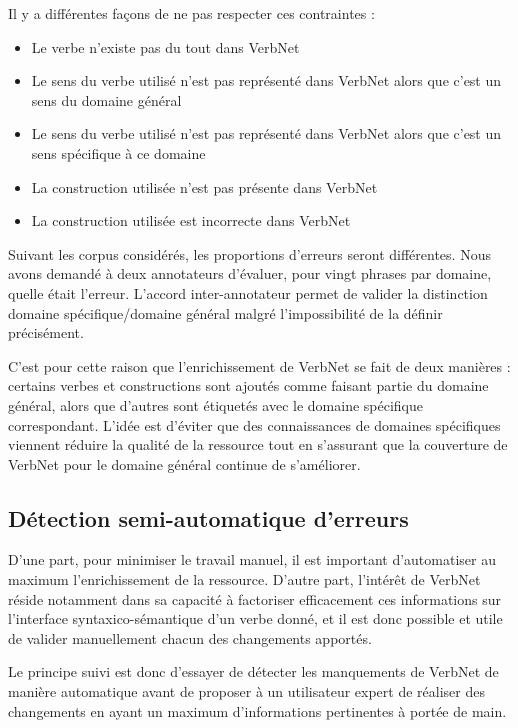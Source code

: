 Il y a différentes façons de ne pas respecter ces contraintes :

\begin{itemize}
    \item Le verbe n'existe pas du tout dans VerbNet
    \item Le sens du verbe utilisé n'est pas représenté dans VerbNet alors que c'est un sens du domaine général
    \item Le sens du verbe utilisé n'est pas représenté dans VerbNet alors que c'est un sens spécifique à ce domaine
    \item La construction utilisée n'est pas présente dans VerbNet
    \item La construction utilisée est incorrecte dans VerbNet
\end{itemize}

Suivant les corpus considérés, les proportions d'erreurs seront différentes.
Nous avons demandé à deux annotateurs d'évaluer, pour vingt phrases par
domaine, quelle était l'erreur. L'accord inter-annotateur permet de valider la
distinction domaine spécifique/domaine général malgré l'impossibilité de la
définir précisément. %

C'est pour cette raison que l'enrichissement de VerbNet se fait de deux
manières : certains verbes et constructions sont ajoutés comme faisant partie
du domaine général, alors que d'autres sont étiquetés avec le domaine
spécifique correspondant. L'idée est d'éviter que des connaissances de domaines
spécifiques viennent réduire la qualité de la ressource tout en s'assurant que
la couverture de VerbNet pour le domaine général continue de s'améliorer.

\subsection{Détection semi-automatique d'erreurs}

D'une part, pour minimiser le travail manuel, il est important d'automatiser au
maximum l'enrichissement de la ressource. D'autre part, l'intérêt de VerbNet
réside notamment dans sa capacité à factoriser efficacement ces informations
sur l'interface syntaxico-sémantique d'un verbe donné, et il est donc possible
et utile de valider manuellement chacun des changements apportés.

Le principe suivi est donc d'essayer de détecter les manquements de VerbNet de
manière automatique avant de proposer à un utilisateur expert de réaliser des
changements en ayant un maximum d'informations pertinentes à portée de main.

